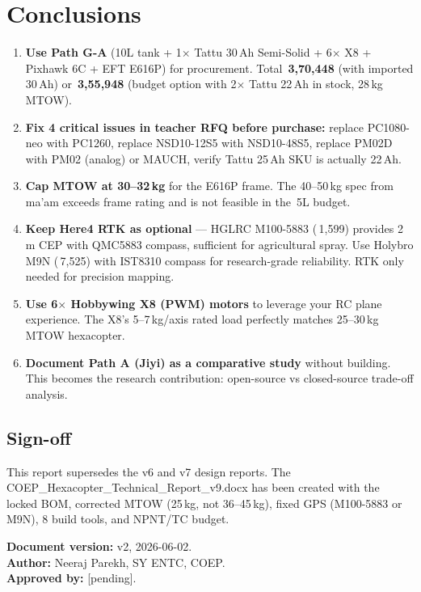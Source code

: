 \documentclass[11pt,a4paper]{article}
\newcommand{\Rs}{\rupee\,}
\begin{document}
\section{Conclusions}

\begin{enumerate}
  \item \textbf{Use Path G-A} (10L tank + 1$\times$ Tattu 30\,Ah Semi-Solid + 6$\times$ X8 + Pixhawk 6C + EFT E616P) for procurement. Total \textbf{\Rs{}3,70,448} (with imported 30\,Ah) or \textbf{\Rs{}3,55,948} (budget option with 2$\times$ Tattu 22\,Ah in stock, 28\,kg MTOW).
  \item \textbf{Fix 4 critical issues in teacher RFQ before purchase:} replace PC1080-neo with PC1260, replace NSD10-12S5 with NSD10-48S5, replace PM02D with PM02 (analog) or MAUCH, verify Tattu 25\,Ah SKU is actually 22\,Ah.
  \item \textbf{Cap MTOW at 30--32\,kg} for the E616P frame. The 40--50\,kg spec from ma'am exceeds frame rating and is not feasible in the \Rs{}5L budget.
  \item \textbf{Keep Here4 RTK as optional} --- HGLRC M100-5883 (\Rs{}1,599) provides 2\,m CEP with QMC5883 compass, sufficient for agricultural spray. Use Holybro M9N (\Rs{}7,525) with IST8310 compass for research-grade reliability. RTK only needed for precision mapping.
  \item \textbf{Use 6$\times$ Hobbywing X8 (PWM) motors} to leverage your RC plane experience. The X8's 5--7\,kg/axis rated load perfectly matches 25--30\,kg MTOW hexacopter.
  \item \textbf{Document Path A (Jiyi) as a comparative study} without building. This becomes the research contribution: open-source vs closed-source trade-off analysis.
\end{enumerate}

\subsection{Sign-off}

This report supersedes the v6 and v7 design reports. The COEP\_Hexacopter\_Technical\_Report\_v9.docx has been created with the locked BOM, corrected MTOW (25\,kg, not 36--45\,kg), fixed GPS (M100-5883 or M9N), 8 build tools, and NPNT/TC budget.

\noindent\textbf{Document version:} v2, 2026-06-02. \\
\textbf{Author:} Neeraj Parekh, SY ENTC, COEP. \\
\textbf{Approved by:} [pending].
\end{document}
